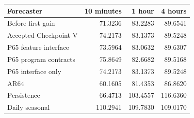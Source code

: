 \begin{tabular}{lrrr}
\toprule
Forecaster & 10 minutes & 1 hour & 4 hours \\
\midrule
Before first gain & 71.3236 & 83.2283 & 89.6541 \\
Accepted Checkpoint V & 74.2173 & 83.1373 & 89.5248 \\
P65 feature interface & 73.5964 & 83.0632 & 89.6307 \\
P65 program contracts & 75.8649 & 82.6682 & 89.5168 \\
P65 interface only & 74.2173 & 83.1373 & 89.5248 \\
AR64 & 60.1605 & 81.4353 & 86.8620 \\
Persistence & 66.4713 & 103.4557 & 116.6360 \\
Daily seasonal & 110.2941 & 109.7830 & 109.0170 \\
\bottomrule
\end{tabular}
